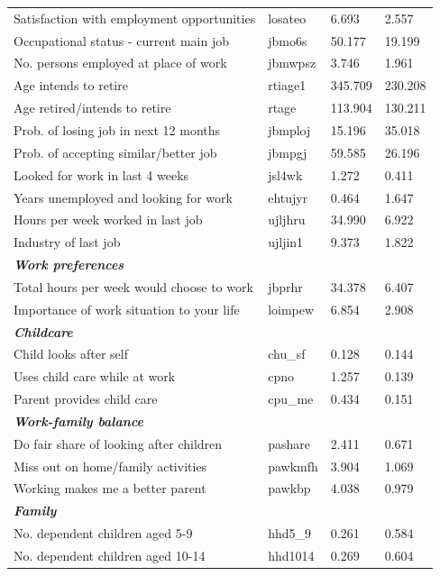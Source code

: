 \documentclass[12pt, a4paper]{article}
\begin{document}
\begin{landscape}
\begin{longtable}{p{} C{0.2\textwidth} C{0.2\textwidth} C{0.2\textwidth}}
Satisfaction with employment opportunities 	& 	losateo	 & 	6.693	 & 	2.557	 \\
Occupational status - current main job 	& 	jbmo6s	 & 	50.177	 & 	19.199	 \\
No.  persons employed at place of work 	& 	jbmwpsz	 & 	3.746	 & 	1.961	 \\
Age intends to retire 	& 	rtiage1	 & 	345.709	 & 	230.208	 \\
Age retired/intends to retire 	& 	rtage	 & 	113.904	 & 	130.211	 \\
Prob.  of losing job in next 12 months 	& 	jbmploj	 & 	15.196	 & 	35.018	 \\
Prob.  of accepting similar/better job 	& 	jbmpgj	 & 	59.585	 & 	26.196	 \\
Looked for work in last 4 weeks 	& 	jsl4wk	 & 	1.272	 & 	0.411	 \\
Years unemployed and looking for work	& 	ehtujyr	 & 	0.464	 & 	1.647	 \\
Hours per week worked in last job 	& 	ujljhru	 & 	34.990	 & 	6.922	 \\
Industry of last job 	& 	ujljin1	 & 	9.373	 & 	1.822	 \\
\textbf{\textit{Work preferences}} 	& 		 & 		 & 		 \\
Total hours per week would choose to work 	& 	jbprhr	 & 	34.378	 & 	6.407	 \\
Importance of work situation to your life 	& 	loimpew	 & 	6.854	 & 	2.908	 \\
\textbf{\textit{Childcare}} 	& 		 & 		 & 		 \\
Child looks after self 	& 	chu\_sf	 & 	0.128	 & 	0.144	 \\
Uses child care while at work	& 	cpno	 & 	1.257	 & 	0.139	 \\
Parent provides child care 	& 	cpu\_me 	 & 	0.434	 & 	0.151	 \\
\textbf{\textit{Work-family balance}} 	& 		 & 		 & 		 \\
Do fair share of looking after children 	& 	pashare	 & 	2.411	 & 	0.671	 \\
Miss out on home/family activities 	& 	pawkmfh	 & 	3.904	 & 	1.069	 \\
Working makes me a better parent 	& 	pawkbp	 & 	4.038	 & 	0.979	 \\
\textbf{\textit{Family}} 	& 		 & 		 & 		 \\
No.  dependent children aged 5-9 	& 	hhd5\_9	 & 	0.261	 & 	0.584	 \\
No.  dependent children aged 10-14 	& 	hhd1014	 & 	0.269	 & 	0.604	 \\

\end{longtable}
\end{landscape}
\end{document}
